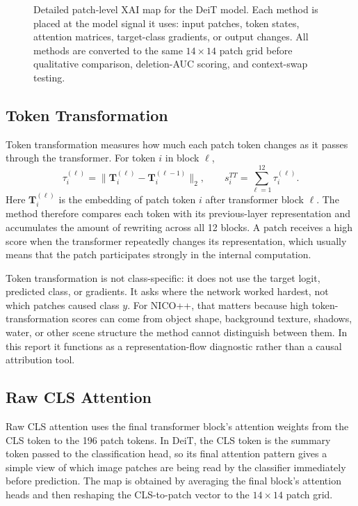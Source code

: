 \documentclass[10pt]{article}
\begin{document}
\begin{figure}[H]
{
}
\caption{Detailed patch-level XAI map for the DeiT model. Each method is placed at the model signal it uses: input patches, token states, attention matrices, target-class gradients, or output changes. All methods are converted to the same $14\times14$ patch grid before qualitative comparison, deletion-AUC scoring, and context-swap testing.}
\label{fig:xai-method-overview}
\end{figure}

\subsection{Token Transformation}
Token transformation measures how much each patch token changes as it passes through the transformer. For token $i$ in block $\ell$,
\[
\tau_i^{(\ell)}=\|\mathbf{T}^{(\ell)}_i-\mathbf{T}^{(\ell-1)}_i\|_2,\qquad
s_i^{TT}=\sum_{\ell=1}^{12}\tau_i^{(\ell)}.
\]
Here $\mathbf{T}^{(\ell)}_i$ is the embedding of patch token $i$ after transformer block $\ell$. The method therefore compares each token with its previous-layer representation and accumulates the amount of rewriting across all 12 blocks. A patch receives a high score when the transformer repeatedly changes its representation, which usually means that the patch participates strongly in the internal computation.

Token transformation is not class-specific: it does not use the target logit, predicted class, or gradients. It asks where the network worked hardest, not which patches caused class $y$. For NICO++, that matters because high token-transformation scores can come from object shape, background texture, shadows, water, or other scene structure the method cannot distinguish between them. In this report it functions as a representation-flow diagnostic rather than a causal attribution tool.

\subsection{Raw CLS Attention}
Raw CLS attention uses the final transformer block's attention weights from the CLS token to the 196 patch tokens. In DeiT, the CLS token is the summary token passed to the classification head, so its final attention pattern gives a simple view of which image patches are being read by the classifier immediately before prediction. The map is obtained by averaging the final block's attention heads and then reshaping the CLS-to-patch vector to the $14\times14$ patch grid.
\end{document}

